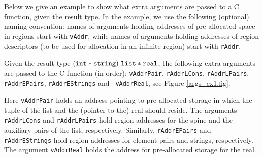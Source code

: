 \documentclass[12pt]{book}
\begin{document}
Below we give an example to show what extra arguments are passed to a
C function, given the result type. In the example, we use the following
(optional) naming convention: 
names of arguments holding addresses of 
pre-allocated space in regions 
start with {\tt vAddr}, while names of arguments
holding addresses of region descriptors (to be used for allocation in an
infinite region) start with {\tt rAddr}.
\begin{example}
  Given the result type $({\tt int} \ast {\tt string}) ~{\tt list}
  \ast {\tt real}$, the following extra ar\-gu\-ments are passed to the
  C function (in order): {\tt vAddrPair}, {\tt rAddrLCons},
  {\tt rAddrLPairs}, {\tt rAddrEPairs}, {\tt rAddrEStrings} and {\tt
    vAddrReal}, see Figure \ref{args_ex1.fig}. 
  
  Here {\tt vAddrPair} holds an address pointing to pre-allocated storage
  in which the tuple of the list and the (pointer to the) real should
  reside. The arguments {\tt rAddrLCons} and {\tt rAddrLPairs} hold region
  addresses for the spine and the auxiliary pairs of the list,
  respectively.  Similarly, {\tt rAddrEPairs} and {\tt rAddrEStrings} hold
  region addresses for element pairs and strings, respectively. The
  argument {\tt vAddrReal} holds the address for pre-allocated storage for
  the real.
\end{example}
\end{document}
